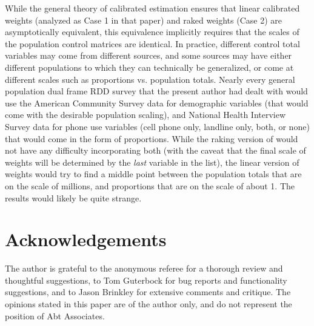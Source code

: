 
While the general theory of calibrated estimation \citep{deville:sarndal:1992}
ensures that linear calibrated weights (analyzed as Case 1 in that paper) and
raked weights (Case 2) are asymptotically equivalent, this equivalence implicitly
requires that the scales of the population control matrices are identical.
In practice, different control total variables may come from different sources,
and some sources may have either different populations to which they can technically
be generalized, or come at different scales such as proportions vs. population totals.
Nearly every general population dual frame RDD survey that the present author had dealt
with would use the American Community Survey data for demographic variables
(that would come with the desirable population scaling), and National Health Interview Survey
data for phone use variables (cell phone only, landline only, both, or none) that would
come in the form of proportions. While the raking version of  would not
have any difficulty incorporating both (with the caveat that the final scale of weights
will be determined by the \textit{last} variable in the  list),
the linear version of weights would try to find a middle point between the population
totals that are on the scale of millions, and proportions that are on the scale of about 1.
The results would likely be quite strange.















\section*{Acknowledgements}

The author is grateful
to the anonymous referee for a thorough review and thoughtful suggestions,
to Tom Guterbock for bug reports and functionality suggestions,
and to Jason Brinkley for extensive comments and critique.
The opinions stated in this paper
are of the author only, and do not represent the position of Abt Associates.



% 

